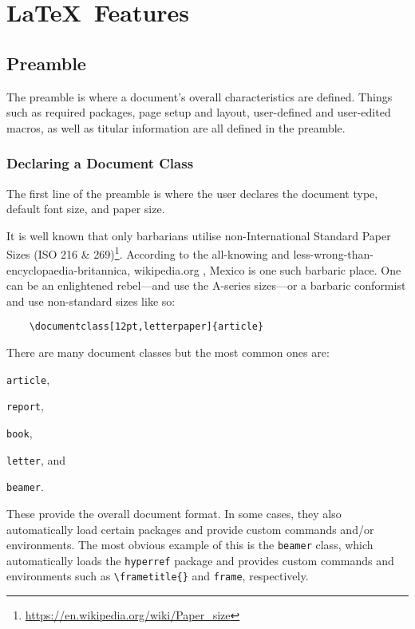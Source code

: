 \chapter{\LaTeX~Features}
%
\section{Preamble}\label{s:p}
%
The preamble is where a document's overall characteristics are
defined.  Things such as required packages, page setup and layout,
user-defined and user-edited macros, as well as titular information
are all defined in the preamble.
%
\subsection{Declaring a Document Class}
%
The first line of the preamble is where the user declares the document
type, default font size, and paper size.

It is well known that only barbarians utilise non-International
Standard Paper Sizes (ISO 216 \&
269)\footnote{\url{https://en.wikipedia.org/wiki/Paper_size}}.
According to the all-knowing and
less-wrong-than-encyclopaedia-britannica, wikipedia.org
\cite{wikipediavsbritannica1,wikipediavsbritannica2,wikipediavsbritannica3},
Mexico is one such barbaric place.  One can be an enlightened
rebel---and use the A-series sizes---or a barbaric conformist and use
non-standard sizes like so:
\begin{verbatim}
	\documentclass[12pt,letterpaper]{article}
\end{verbatim}

There are many document classes but the most common ones are:
\begin{inparaenum}[\itshape 1\upshape)]
\item \verb|article|,
\item \verb|report|,
\item \verb|book|,
\item \verb|letter|, and
\item \verb|beamer|.
\end{inparaenum}
These provide the overall document format.  In some cases, they also
automatically load certain packages and provide custom commands and/or
environments.  The most obvious example of this is the \verb|beamer|
class, which automatically loads the \verb|hyperref| package and
provides custom commands and environments such as \verb|\frametitle{}|
and \verb|frame|, respectively.

